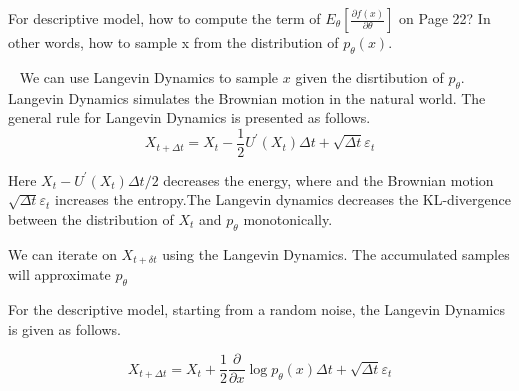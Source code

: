 \begin{exercise}[]{For descriptive model, how to compute the term of $E_\theta [\frac{\partial f(x)}{\partial \theta}]$ on Page 22? In other words, how to sample x from the distribution of $p_\theta(x)$.}
  \begin{solution}
  \par{~}
  We can use Langevin Dynamics to sample $x$ given the disrtibution of $p_\theta$. Langevin Dynamics simulates the Brownian motion in the natural world. The general rule for Langevin Dynamics is presented as follows.
  \begin{equation}
    X_{t+\Delta t}=X_{t}-\frac{1}{2} U^{\prime}\left(X_{t}\right) \Delta t+\sqrt{\Delta t} \varepsilon_{t}
  \end{equation}

  Here $X_{t}-U^{\prime}\left(X_{t}\right) \Delta t / 2$ decreases the energy, where  and the Brownian motion $\sqrt{\Delta t} \varepsilon_{t}$ increases the entropy.The Langevin dynamics decreases the KL-divergence between the distribution of $X_{t}$ and $p_{\theta}$ monotonically.

  We can iterate on $X_{t+\delta t}$ using the Langevin Dynamics. The accumulated samples will approximate $p_{\theta}$

  For the descriptive model, starting from a random noise, the Langevin Dynamics is given as follows.

  \begin{equation}
    X_{t+\Delta t}=X_{t}+\frac{1}{2} \frac{\partial}{\partial x} \log p_{\theta}\left(x\right) \Delta t+\sqrt{\Delta t} \varepsilon_{t}
  \end{equation}
  

  \end{solution}
  \label{ex4}
\end{exercise}

